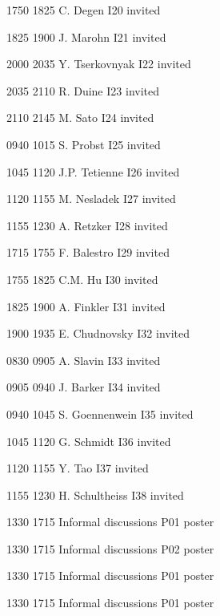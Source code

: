          {1750} {1825} {C. Degen} {} {I20} {invited}
        
         {1825} {1900} {J. Marohn} {} {I21} {invited}
        
         {2000} {2035} {Y. Tserkovnyak} {} {I22} {invited}
        
         {2035} {2110} {R. Duine} {} {I23} {invited}
        
         {2110} {2145} {M. Sato} {} {I24} {invited}
        
         {0940} {1015} {S. Probst} {} {I25} {invited}
        
         {1045} {1120} {J.P. Tetienne} {} {I26} {invited}
        
         {1120} {1155} {M. Nesladek} {} {I27} {invited}
        
         {1155} {1230} {A. Retzker} {} {I28} {invited}
        
         {1715} {1755} {F. Balestro} {} {I29} {invited}
        
         {1755} {1825} {C.M. Hu} {} {I30} {invited}
        
         {1825} {1900} {A. Finkler} {} {I31} {invited}
        
         {1900} {1935} {E. Chudnovsky} {} {I32} {invited}
        
         {0830} {0905} {A. Slavin} {} {I33} {invited}
        
         {0905} {0940} {J. Barker} {} {I34} {invited}
        
         {0940} {1045} {S. Goennenwein} {} {I35} {invited}
        
         {1045} {1120} {G. Schmidt} {} {I36} {invited}
        
         {1120} {1155} {Y. Tao} {} {I37} {invited}
        
         {1155} {1230} {H. Schultheiss} {} {I38} {invited}
        
         {1330} {1715} {Informal discussions} {} {P01} {poster}
        
         {1330} {1715} {Informal discussions} {} {P02} {poster}
        
         {1330} {1715} {Informal discussions} {} {P01} {poster}
        
         {1330} {1715} {Informal discussions} {} {P01} {poster}
        
